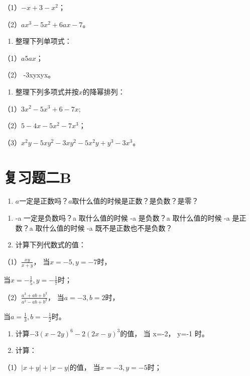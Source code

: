 （1）\(-x + 3 - x^2\)；

（2）\(ax^3 - 5x^2 + 6ax - 7\)。

\begin{enumerate}[start=16]
\item
  整理下列单项式：
\end{enumerate}

（1）\(a5ax\)；

（2） -3xyxyx。

\begin{enumerate}[start=17]
\item
  整理下列多项式并按\(x\)的降幂排列：
\end{enumerate}

（1）\(3x^{2} - 5x^{3} + 6 - 7x;\)

（2）\(5 - 4x - 5x^{2} - 7x^{3}\)；

（3）\(x^{2}y - 5xy^{2} - 3xy^{2} - 5x^{2}y + y^{3} - 3x^{3}\)。

\section{复习题二B}

\begin{enumerate}[start=1]
\item
  \(a\)一定是正数吗？\(a\)取什么值的时候是正数？是负数？是零？
\end{enumerate}

\begin{enumerate}[start=2]
\item
  -a 一定是负数吗？a 取什么值的时候 -a 是负数？a 取什么值的时候 -a
  是正数？a 取什么值的时候 -a 既不是正数也不是负数？
\item
  计算下列代数式的值：
\end{enumerate}

（1）\(\frac{xy}{x + y}\)， 当\(x = -5, y = -7\)时，

当\(x = -\frac{1}{5}, y = -\frac{1}{7}\)时；

（2）\(\frac{a^3 + ab + b^3}{a^2 - ab + b^2}\)， 当\(a = -3, b = 2\)时，

当\(a = \frac{1}{3}, b = -\frac{1}{2}\)时。

\begin{enumerate}[start=4]
\item
  计算\(-3(x-2y)^{6}-2(2x-y)^{3}\)的值， 当 x=-2， y=-1 时。
\item
  计算：
\end{enumerate}

（1）\(|x+y|+|x-y|\)的值， 当\(x=-3,y=-5\)时；

